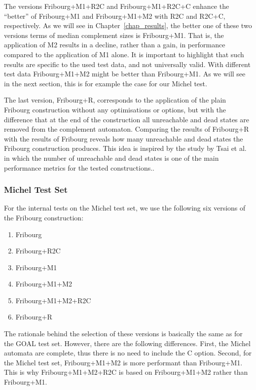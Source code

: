 The versions Fribourg+M1+R2C and Fribourg+M1+R2C+C enhance the ``better'' of Fribourg+M1 and Fribourg+M1+M2 with R2C and R2C+C, respectively. As we will see in Chapter~\ref{chap_results}, the better one of these two versions terms of median complement sizes is Fribourg+M1. That is, the application of M2 results in a decline, rather than a gain, in performance compared to the application of M1 alone. It is important to highlight that such results are specific to the used test data, and not universally valid. With different test data Fribourg+M1+M2 might be better than Fribourg+M1. As we will see in the next section, this is for example the case for our Michel test.

The last version, Fribourg+R, corresponds to the application of the plain Fribourg construction without any optimisations or options, but with the difference that at the end of the construction all unreachable and dead states are removed from the complement automaton. Comparing the results of Fribourg+R with the results of Fribourg reveals how many unreachable and dead states the Fribourg construction produces. This idea is inspired by the study by Tsai et al.~\cite{2011_tsai} in which the number of unreachable and dead states is one of the main performance metrics for the tested constructions..

\subsubsection{Michel Test Set}
For the internal tests on the Michel test set, we use the following six versions of the Fribourg construction:
\begin{enumerate}
\item Fribourg
\item Fribourg+R2C
\item Fribourg+M1
\item Fribourg+M1+M2
\item Fribourg+M1+M2+R2C
\item Fribourg+R
\end{enumerate}

The rationale behind the selection of these versions is basically the same as for the GOAL test set. However, there are the following differences. First, the Michel automata are complete, thus there is no need to include the C option. Second, for the Michel test set, Fribourg+M1+M2 is more performant than Fribourg+M1. This is why Fribourg+M1+M2+R2C is based on Fribourg+M1+M2 rather than Fribourg+M1.


